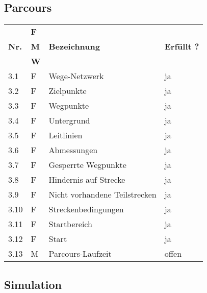 \documentclass[main.tex]{subfiles} %
\begin{document}
\subsection*{Parcours}

\begin{tabular}{|l|p{0.5cm}|p{4cm}|p{10cm}|}
  \hline
               & \textbf{F} &                               &                    \\
  \textbf{Nr.} & \textbf{M} & \textbf{Bezeichnung}          & \textbf{Erfüllt ?} \\
               & \textbf{W} &                               &                    \\
  \hline
  3.1          & F          & Wege-Netzwerk                 & ja                 \\
  3.2          & F          & Zielpunkte                    & ja                 \\
  3.3          & F          & Wegpunkte                     & ja                 \\
  3.4          & F          & Untergrund                    & ja                 \\
  3.5          & F          & Leitlinien                    & ja                 \\
  3.6          & F          & Abmessungen                   & ja                 \\
  3.7          & F          & Gesperrte Wegpunkte           & ja                 \\
  3.8          & F          & Hindernis auf Strecke         & ja                 \\
  3.9          & F          & Nicht vorhandene Teilstrecken & ja                 \\
  3.10         & F          & Streckenbedingungen           & ja                 \\
  3.11         & F          & Startbereich                  & ja                 \\
  3.12         & F          & Start                         & ja                 \\
  3.13         & M          & Parcours-Laufzeit             & offen              \\
  \hline
\end{tabular}

\subsection*{Simulation}
\end{document}
